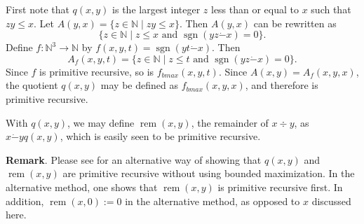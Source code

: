\documentclass[12pt]{article}
\begin{document}
First note that $q(x,y)$ is the largest integer $z$ less than or equal to $x$ such that $zy\le x$.  Let $A(y,x)=\lbrace z\in \mathbb{N} \mid zy \le x \rbrace$.  Then $A(y,x)$ can be rewritten as $$\lbrace z\in \mathbb{N} \mid z \le x \mbox{ and } \operatorname{sgn}(yz \dot{-} x)=0 \rbrace.$$
Define $f:\mathbb{N}^3 \to \mathbb{N}$ by $f(x,y,t)=\operatorname{sgn}(yt \dot{-} x)$.  Then $$A_f(x,y,t)=\lbrace z\in \mathbb{N} \mid z\le t \mbox{ and }\operatorname{sgn}(yz \dot{-} x) = 0 \rbrace.$$
Since $f$ is primitive recursive, so is $f_{bmax}(x,y,t)$.  Since $A(x,y)=A_f(x,y,x)$, the quotient $q(x,y)$ may be defined as $f_{bmax}(x,y,x)$, and therefore is primitive recursive.

With $q(x,y)$, we may define $\operatorname{rem}(x,y)$, the remainder of $x\div y$, as $x\dot{-} y q(x,y)$, which is easily seen to be primitive recursive.

\textbf{Remark}.  Please see  for an alternative way of showing that $q(x,y)$ and $\operatorname{rem}(x,y)$ are primitive recursive without using bounded maximization.  In the alternative method, one shows that $\operatorname{rem}(x,y)$ is primitive recursive first.  In addition, $\operatorname{rem}(x,0):=0$ in the alternative method, as opposed to $x$ discussed here.
\end{document}
